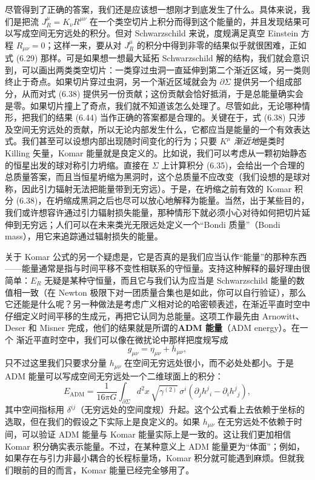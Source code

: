 尽管得到了正确的答案，我们还是应该想一想刚才到底发生了什么。具体来说，我们是把流 $J^{\mu}_{R}=K_{\nu}R^{\mu\nu}$ 在一个类空切片上积分而得到这个能量的，并且发现结果可以写成空间无穷远处的积分。但对 Schwarzschild 来说，度规满足真空 Einstein 方程 $R_{\mu\nu}=0$；这样一来，要从对 $J^{\mu}_{R}$ 的积分中得到非零的结果似乎就很困难，正如式 (6.29) 那样。可是如果想一想最大延拓 Schwarzschild 解的结构，我们就会意识到，可以画出两类类空切片：一类穿过虫洞一直延伸到第二个渐近区域，另一类则终止于奇点。如果切片穿过虫洞，另一个渐近区域就会为 $\partial\Sigma$ 提供另一个组成部分，从而对式 (6.38) 提供另一份贡献；这份贡献会恰好抵消，于是总能量确实会是零。如果切片撞上了奇点，我们就不知道该怎么处理了。尽管如此，无论哪种情形，把我们的结果 (6.44) 当作正确的答案都是合理的。关键在于，式 (6.38) 只涉及空间无穷远处的贡献，所以无论内部发生什么，它都应当是能量的一个有效表达式。我们甚至可以设想内部出现随时间变化的行为；只要 $K^{\mu}$ \emph{渐近地}是类时 Killing 矢量，Komar 能量就是良定义的。比如说，我们可以考虑从一颗初始静态的恒星出发的球对称引力坍缩。直接在 $\Sigma$ 上计算积分 (6.35)，会给出一个合理的总质量答案，而且当恒星坍缩为黑洞时，这个总质量不应改变（我们设想的是球对称，因此引力辐射无法把能量带到无穷远）。于是，在坍缩之前有效的 Komar 积分 (6.38)，在坍缩成黑洞之后也尽可以放心地解释为能量。当然，出于某些目的，我们或许想容许通过引力辐射损失能量，那种情形下就必须小心对待如何把切片延伸到无穷远；人们可以在未来类光无限远处定义一个“Bondi 质量”（Bondi mass），用它来追踪通过辐射损失的能量。

关于 Komar 公式的另一个疑虑是，它是否真的是我们应当认作“能量”的那种东西——能量通常是指与时间平移不变性相联系的守恒量。支持这种解释的最好理由很简单：$E_{R}$ 无疑是某种守恒量，而且它与我们认为应当是 Schwarzschild 能量的数值相一致（在 Newton 极限下对一团质量合集也是如此，你可以自行验证），那么它还能是什么呢？另一种做法是考虑广义相对论的哈密顿表述，在渐近平直时空中仔细定义时间平移的生成元，再把它认同为总能量。这项工作最先由 Arnowitt、Deser 和 Misner 完成，他们的结果就是所谓的\textbf{ADM 能量}（ADM energy）。在一个
渐近平直时空中，我们可以像在微扰论中那样把度规写成
\begin{equation*}
g_{\mu\nu} = \eta_{\mu\nu} + h_{\mu\nu},
\tag{6.45}
\end{equation*}
只不过这里我们只要求分量 $h_{\mu\nu}$ 在空间无穷远处很小，而不必处处都小。于是 ADM 能量可以写成空间无穷远处一个二维球面上的积分：
\begin{equation*}
E_{\mathrm{ADM}} = \frac{1}{16\pi G}\int_{\partial\Sigma} d^{2}x\,\sqrt{\gamma^{(2)}}\,\sigma^{i}\left(\partial_{j}h^{j}{}_{i}-\partial_{i}h^{j}{}_{j}\right),
\tag{6.46}
\end{equation*}
其中空间指标用 $\delta^{ij}$（无穷远处的空间度规）升起。这个公式看上去依赖于坐标的选取，但在我们的假设之下实际上是良定义的。如果 $h_{\mu\nu}$ 在无穷远处不依赖于时间，可以验证 ADM 能量与 Komar 能量实际上是一致的。这让我们更加相信 Komar 积分确实表示能量。不过，在某种意义上 ADM 能量更为“体面”；例如，如果存在与引力非最小耦合的长程标量场，Komar 积分就可能遇到麻烦。但就我们眼前的目的而言，Komar 能量已经完全够用了。

